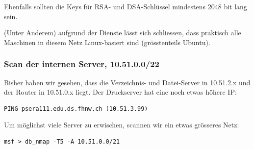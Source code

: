 \documentclass[11pt,a4paper]{scrartcl}
\begin{document}
Ebenfalls sollten die Keys für RSA- und DSA-Schlüssel mindestens 2048 bit lang sein.

(Unter Anderem) aufgrund der Dienste lässt sich schliessen, dass praktisch alle Maschinen in diesem Netz Linux-basiert sind (grösstenteils Ubuntu).

\subsubsection{Scan der internen Server, 10.51.0.0/22}
Bisher haben wir gesehen, dass die Verzeichnis- und Datei-Server in 10.51.2.x und der Router in 10.51.0.x liegt. Der Druckserver hat eine noch etwas höhere IP:
\begin{verbatim}PING psera111.edu.ds.fhnw.ch (10.51.3.99)\end{verbatim}
Um möglichst viele Server zu erwischen, scannen wir ein etwas grösseres Netz:
\begin{verbatim}msf > db_nmap -T5 -A 10.51.0.0/21\end{verbatim}
\end{document}
